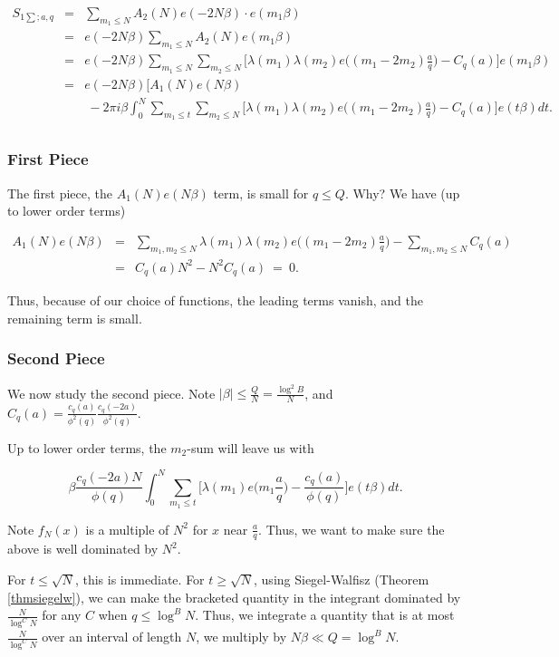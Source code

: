 \documentclass[12pt,letterpaper]{report}
\newcommand\be{\begin{equation}}
\newcommand\ee{\end{equation}}
\newcommand\bea{\begin{eqnarray}}
\newcommand\eea{\end{eqnarray}}
\newcommand{\gl}{\lambda}
\begin{document}
\bea S_{1\sum;a,q} & = & \sum_{m_1 \le N} A_2(N) e(-2N \beta)
\cdot e(m_1 \beta) \nonumber\\ &=& e(-2N \beta) \sum_{m_1 \le N}
A_2(N) e(m_1 \beta) \nonumber\\ &=& e(-2N \beta) \sum_{m_1 \le N}
\sum_{m_2 \le N} \Big[ \gl(m_1)\gl(m_2)e\Big( (m_1 -
2m_2)\frac{a}{q}\Big)  - C_q(a) \Big] e(m_1 \beta) \nonumber\\ &=&
e(-2N\beta) \Bigg[A_1(N) e(N\beta) \nonumber\\ & & \ - 2\pi i
\beta \int_0^N \sum_{m_1 \le t} \sum_{m_2 \le N} \Big[
\gl(m_1)\gl(m_2)e\Big( (m_1 - 2m_2)\frac{a}{q}\Big)  - C_q(a)
\Big] e(t \beta)dt. \nonumber\\ & & \eea


\subsubsection{First Piece}

The first piece, the $A_1(N) e(N\beta)$ term, is small for $q \le
Q$. Why? We have (up to lower order terms)

\bea A_1(N) e(N\beta) &=& \sum_{m_1, m_2 \le N} \gl(m_1)\gl(m_2)
e\Big( (m_1 - 2m_2)\frac{a}{q}\Big)  - \sum_{m_1, m_2 \le N}
C_q(a) \nonumber\\ &=& C_q(a) N^2 - N^2 C_q(a) \ = \ 0. \eea

Thus, because of our choice of functions, the leading terms
vanish, and the remaining term is small.

\subsubsection{Second Piece}

We now study the second piece. Note $|\beta| \le \frac{Q}{N} =
\frac{\log^2 B}{N}$, and $C_q(a) = \frac{c_q(a)}{\phi^2(q)}
\frac{c_q(-2a)}{\phi^2(q)}$.

Up to lower order terms, the $m_2$-sum will leave us with

\be \beta \frac{c_q(-2a)N}{\phi(q)}\int_0^N \sum_{m_1\le t} \Bigg[
\gl(m_1) e\Big( m_1 \frac{a}{q} \Big) - \frac{c_q(a)}{\phi(q)}
\Bigg] e(t\beta) dt. \ee

Note $f_N(x)$ is a multiple of $N^2$ for $x$ near $\frac{a}{q}$.
Thus, we want to make sure the above is well dominated by $N^2$.

For $t \le \sqrt{N}$, this is immediate. For $t \ge \sqrt{N}$,
using Siegel-Walfisz (Theorem \ref{thmsiegelw}), we can make the
bracketed quantity in the integrant dominated by $\frac{N}{\log^C
N}$ for any $C$ when $q \le \log^B N$. Thus, we integrate a
quantity that is at most $\frac{N}{\log^C N}$ over an interval of
length $N$, we multiply by $N\beta \ll Q = \log^B N$.
\end{document}
